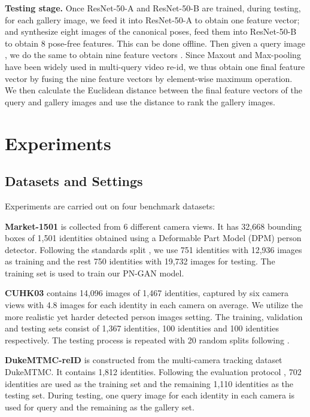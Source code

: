 \documentclass[10pt,letterpaper,twocolumn,10pt,letterpaper,twocolumn]{article}
\begin{document}
\noindent \textbf{Testing stage. } Once ResNet-50-A and ResNet-50-B
are trained, during testing, for each gallery image, we feed it into
ResNet-50-A to obtain one feature vector; and synthesize eight images
of the canonical poses, feed them into ResNet-50-B to obtain 8 pose-free
features. This can be done offline. Then given a query image ,
we do the same to obtain nine feature vectors .
Since Maxout and Max-pooling have been widely used in multi-query
video re-id, we thus obtain one final feature vector by fusing the
nine feature vectors by element-wise maximum operation. We then calculate
the Euclidean distance between the final feature vectors of the query
and gallery images and use the distance to rank the gallery images.

\section{Experiments}

\subsection{Datasets and Settings}

\noindent Experiments are carried out on four benchmark datasets: 

\noindent \noindent \textbf{Market-1501} \cite{market1501} is collected from 6
different camera views. It has 32,668 bounding boxes of 1,501 identities
obtained using a Deformable Part Model (DPM) person detector. Following
the standards split \cite{market1501}, we use 751 identities with
12,936 images as training and the rest 750 identities with 19,732
images for testing. The training set is used to train our PN-GAN model.
\textbf{ }

\noindent \noindent \textbf{CUHK03} \cite{deepreid} contains 14,096 images of
1,467 identities, captured by six camera views with 4.8 images for
each identity in each camera on average. We utilize the more realistic
yet harder detected person images setting. The training, validation
and testing sets consist of 1,367 identities, 100 identities and 100
identities respectively. The testing process is repeated with 20 random
splits following \cite{deepreid}. \textbf{ }

\noindent \noindent \textbf{DukeMTMC-reID} \cite{Duke_ori_data} is  constructed from the
multi-camera tracking dataset \textendash{} DukeMTMC. It contains
1,812 identities. Following the evaluation protocol \cite{zheng2017unlabeled},
702 identities are used as the training set and the remaining 1,110
identities as the testing set. During testing, one query image for
each identity in each camera is used for query and the remaining as
the gallery set. 
\end{document}
